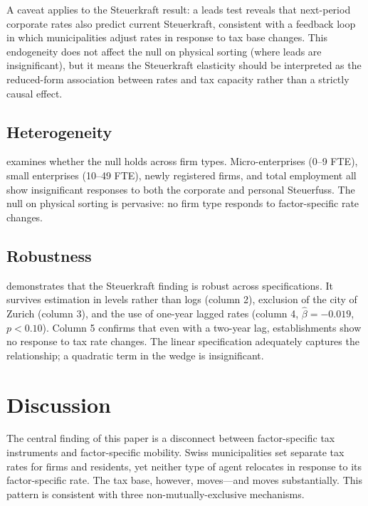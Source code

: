 \documentclass[12pt]{article}
\begin{document}
A caveat applies to the Steuerkraft result: a leads test reveals that next-period corporate rates also predict current Steuerkraft, consistent with a feedback loop in which municipalities adjust rates in response to tax base changes. This endogeneity does not affect the null on physical sorting (where leads are insignificant), but it means the Steuerkraft elasticity should be interpreted as the reduced-form association between rates and tax capacity rather than a strictly causal effect.

\subsection{Heterogeneity}

 examines whether the null holds across firm types. Micro-enterprises (0--9 FTE), small enterprises (10--49 FTE), newly registered firms, and total employment all show insignificant responses to both the corporate and personal Steuerfuss. The null on physical sorting is pervasive: no firm type responds to factor-specific rate changes.



\subsection{Robustness}

 demonstrates that the Steuerkraft finding is robust across specifications. It survives estimation in levels rather than logs (column 2), exclusion of the city of Zurich (column 3), and the use of one-year lagged rates (column 4, $\hat{\beta} = -0.019$, $p < 0.10$). Column 5 confirms that even with a two-year lag, establishments show no response to tax rate changes. The linear specification adequately captures the relationship; a quadratic term in the wedge is insignificant.




\section{Discussion}

The central finding of this paper is a disconnect between factor-specific tax instruments and factor-specific mobility. Swiss municipalities set separate tax rates for firms and residents, yet neither type of agent relocates in response to its factor-specific rate. The tax base, however, moves---and moves substantially. This pattern is consistent with three non-mutually-exclusive mechanisms.
\end{document}
